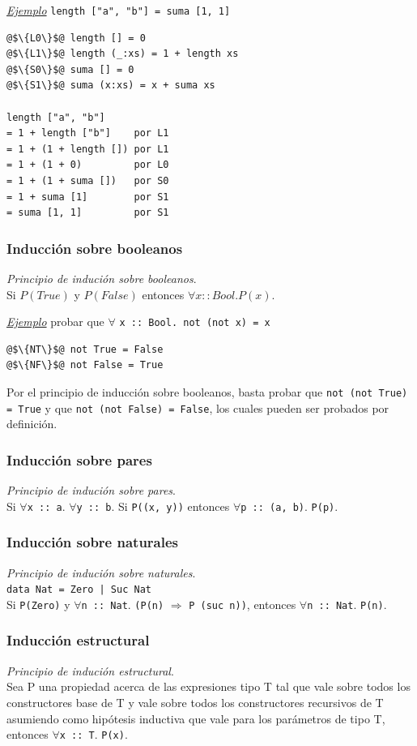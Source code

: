 \documentclass[12pt]{extarticle}
\def\ejemplo{\textit{\underline{Ejemplo} }}
\newcommand\hsline[1]{\texttt{#1}}
\newcommand\paratodo[2]{$\forall$\hsline{#1 :: #2}.}
\begin{document}
\ejemplo \hsline{length ["a", "b"] = suma [1, 1]}

\begin{verbatim}
@$\{L0\}$@ length [] = 0
@$\{L1\}$@ length (_:xs) = 1 + length xs
@$\{S0\}$@ suma [] = 0
@$\{S1\}$@ suma (x:xs) = x + suma xs

length ["a", "b"]
= 1 + length ["b"]    por L1
= 1 + (1 + length []) por L1
= 1 + (1 + 0)         por L0
= 1 + (1 + suma [])   por S0
= 1 + suma [1]        por S1
= suma [1, 1]         por S1
\end{verbatim}

\subsubsection{Inducción sobre booleanos}
\textit{Principio de indución sobre booleanos}. \\
Si $P(True)$ y $P(False)$ entonces $\forall x :: Bool. P(x)$.

\ejemplo probar que $\forall$ \hsline{x :: Bool. not (not x) = x}

\begin{verbatim}
@$\{NT\}$@ not True = False
@$\{NF\}$@ not False = True
\end{verbatim}

Por el principio de inducción sobre booleanos, basta probar que \hsline{not (not True) = True} y que \hsline{not (not False) = False}, los cuales pueden ser probados por definición.


\subsubsection{Inducción sobre pares}
\textit{Principio de indución sobre pares}. \\
Si \paratodo{x}{a} \paratodo{y}{b} Si \hsline{P((x, y))} entonces \paratodo{p}{(a, b)} \hsline{P(p)}.

\subsubsection{Inducción sobre naturales}
\textit{Principio de indución sobre naturales}. \\
\hsline{data Nat = Zero | Suc Nat} \\
Si \hsline{P(Zero)} y \paratodo{n}{Nat} \hsline{(P(n)} $\Rightarrow$ \hsline{P (suc n))}, entonces \paratodo{n}{Nat} \hsline{P(n)}.

\subsubsection{Inducción estructural}
\textit{Principio de indución estructural}. \\
Sea P una propiedad acerca de las expresiones tipo T tal que vale sobre todos los constructores base de T y vale sobre todos los constructores recursivos de T asumiendo como hipótesis inductiva que vale para los parámetros de tipo T, entonces \paratodo{x}{T} \hsline{P(x)}.
\end{document}
